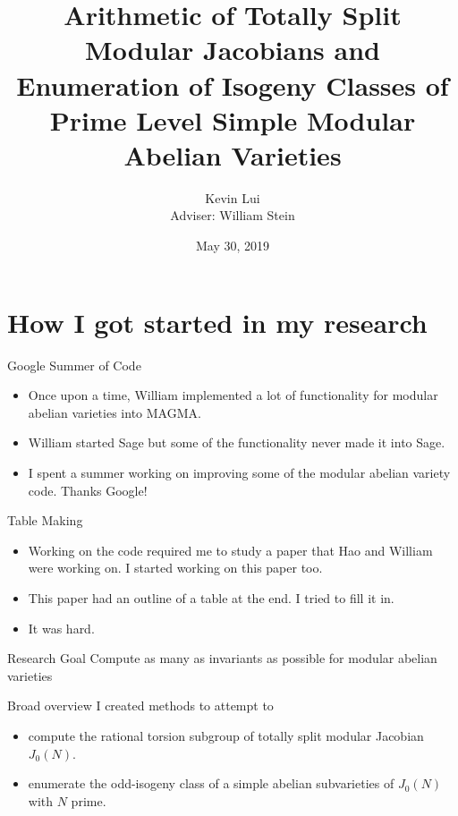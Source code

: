 \documentclass{beamer}
\title{%
    Arithmetic of Totally Split Modular Jacobians and Enumeration of Isogeny
    Classes of Prime Level Simple Modular Abelian Varieties
}
\author{Kevin Lui\\Adviser: William Stein}
\date{May 30, 2019}
\institute{Final Exam}
\begin{document}
\frame{\titlepage}

\section{How I got started in my research}

\begin{frame}{Google Summer of Code}
    \begin{itemize}
        \item 
            Once upon a time, William implemented a lot of functionality
            for modular abelian varieties into MAGMA.
        \item
            William started Sage but some of the functionality never made it
            into Sage.
        \item
            I spent a summer working on improving some of the modular abelian
            variety code. Thanks Google!
    \end{itemize} 
\end{frame}

\begin{frame}{Table Making}
    \begin{itemize}
        \item
            Working on the code required me to study a paper that Hao and
            William were working on. I started working on this paper too.
        \item
            This paper had an outline of a table at the end. I tried to fill it
            in.
        \item
            It was hard.
   \end{itemize} 
\end{frame}

\begin{frame}{Research Goal}
    \Huge{Compute as many as invariants as possible for modular abelian
    varieties}
\end{frame}

\begin{frame}{Broad overview}
    I created methods to attempt to
    \begin{itemize}
        \item
            compute the rational torsion subgroup of totally split modular
            Jacobian $J_0(N)$.
        \item
            enumerate the odd-isogeny class of a simple abelian subvarieties of
            $J_0(N)$ with $N$ prime.
    \end{itemize}
\end{frame}
\end{document}
